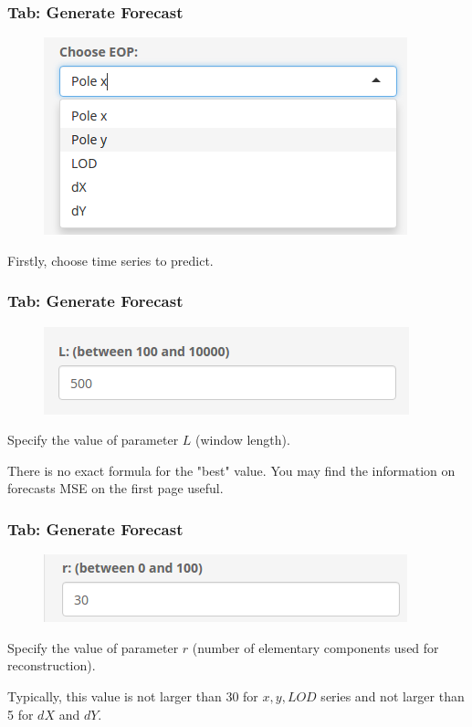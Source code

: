 \documentclass[pdf, unicode, notheorems, xcolor={table}]{beamer}
\begin{document}
\begin{frame}\frametitle{Tab: Generate Forecast}
	\begin{figure}
		\includegraphics[width=0.9 \linewidth]{dropdown}
	\end{figure}
	Firstly, choose time series to predict.
\end{frame}

\begin{frame}\frametitle{Tab: Generate Forecast}
	\begin{figure}
		\includegraphics[width=0.9 \linewidth]{parameter_L}
	\end{figure}
	Specify the value of parameter $ L $ (window length).
	
	There is no exact formula for the "best" value. You may find the information on forecasts MSE on the first page useful.
\end{frame}

\begin{frame}\frametitle{Tab: Generate Forecast}
	\begin{figure}
		\includegraphics[width=0.9 \linewidth]{parameter_r}
	\end{figure}
	Specify the value of parameter $ r $ (number of elementary components used for reconstruction).
	
	Typically, this value is not larger than 30 for $ x, y, LOD $ series and not larger than 5 for $ dX $ and $ dY $.
\end{frame}
\end{document}
